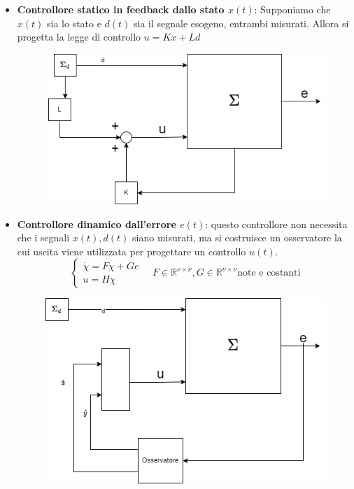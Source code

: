 \documentclass{article}
\theoremstyle{definition}
\begin{document}
\begin{itemize}
	\item \textbf{Controllore statico in feedback dallo stato \(x(t)\)}: Supponiamo che \(x(t)\) sia lo stato e \(d(t)\) sia il segnale esogeno, entrambi misurati. Allora si progetta la legge di controllo \(u=K x+L d\)
	      \begin{figure}[h]
		      \centering
		      \includegraphics[scale=0.3]{uStatico.drawio.png}
	      \end{figure}
	\item \textbf{Controllore dinamico dall'errore \(e(t)\)}: questo controllore non necessita che i segnali \(x(t),d(t)\) siano misurati, ma si costruisce un osservatore la cui uscita viene utilizzata per progettare un controllo \(u(t)\).\begin{equation*}
		      \begin{cases}
			      \dot{\chi}= F\chi+G e \\
			      u=H\chi
		      \end{cases}
		      \quad F\in\mathbb{R}^{\nu\times\nu},G\in\mathbb{R}^{\nu\times\nu}\text{note e costanti}
	      \end{equation*}
          \begin{figure}[h]
            \centering
            \includegraphics[scale=0.3]{uDynamic.drawio.png}
        \end{figure}
\end{itemize}
\end{document}
